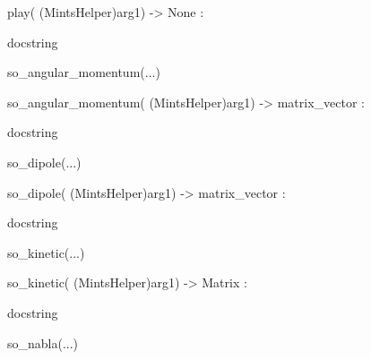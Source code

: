 \documentclass[letterpaper,10pt,english]{sphinxmanual}
\begin{document}
\begin{description}
\begin{description}
\begin{DUlineblock}{0em}
\begin{DUlineblock}{\DUlineblockindent}
\item[] play( (MintsHelper)arg1) -\textgreater{} None :
\item[]
\begin{DUlineblock}{\DUlineblockindent}
\item[] docstring
\item[] 
\end{DUlineblock}
\end{DUlineblock}
\item[] so\_angular\_momentum(...)
\item[]
\begin{DUlineblock}{\DUlineblockindent}
\item[] so\_angular\_momentum( (MintsHelper)arg1) -\textgreater{} matrix\_vector :
\item[]
\begin{DUlineblock}{\DUlineblockindent}
\item[] docstring
\item[] 
\end{DUlineblock}
\end{DUlineblock}
\item[] so\_dipole(...)
\item[]
\begin{DUlineblock}{\DUlineblockindent}
\item[] so\_dipole( (MintsHelper)arg1) -\textgreater{} matrix\_vector :
\item[]
\begin{DUlineblock}{\DUlineblockindent}
\item[] docstring
\item[] 
\end{DUlineblock}
\end{DUlineblock}
\item[] so\_kinetic(...)
\item[]
\begin{DUlineblock}{\DUlineblockindent}
\item[] so\_kinetic( (MintsHelper)arg1) -\textgreater{} Matrix :
\item[]
\begin{DUlineblock}{\DUlineblockindent}
\item[] docstring
\item[] 
\end{DUlineblock}
\end{DUlineblock}
\item[] so\_nabla(...)
\item[]

\end{DUlineblock}
\end{description}
\end{description}
\end{document}
